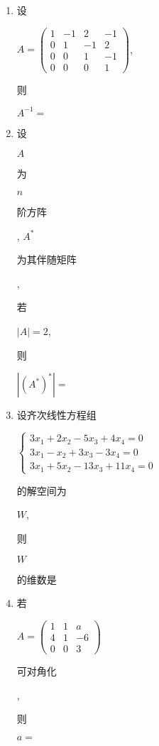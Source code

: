\documentclass[10pt]{article}
\begin{document}
\begin{enumerate}
  \item \begin{CJK}{UTF8}{mj}设\end{CJK} $A=\left(\begin{array}{cccc}1 & -1 & 2 & -1 \\ 0 & 1 & -1 & 2 \\ 0 & 0 & 1 & -1 \\ 0 & 0 & 0 & 1\end{array}\right)$, \begin{CJK}{UTF8}{mj}则\end{CJK} $A^{-1}=$

  \item \begin{CJK}{UTF8}{mj}设\end{CJK} $A$ \begin{CJK}{UTF8}{mj}为\end{CJK} $n$ \begin{CJK}{UTF8}{mj}阶方阵\end{CJK}, $A^{*}$ \begin{CJK}{UTF8}{mj}为其伴随矩阵\end{CJK}, \begin{CJK}{UTF8}{mj}若\end{CJK} $|A|=2$, \begin{CJK}{UTF8}{mj}则\end{CJK} $\left|\left(A^{*}\right)^{*}\right|=$

  \item \begin{CJK}{UTF8}{mj}设齐次线性方程组\end{CJK} $\left\{\begin{array}{c}3 x_{1}+2 x_{2}-5 x_{3}+4 x_{4}=0 \\ 3 x_{1}-x_{2}+3 x_{3}-3 x_{4}=0 \\ 3 x_{1}+5 x_{2}-13 x_{3}+11 x_{4}=0\end{array}\right.$ \begin{CJK}{UTF8}{mj}的解空间为\end{CJK} $W$, \begin{CJK}{UTF8}{mj}则\end{CJK} $W$ \begin{CJK}{UTF8}{mj}的维数是\end{CJK}

  \item \begin{CJK}{UTF8}{mj}若\end{CJK} $A=\left(\begin{array}{ccc}1 & 1 & a \\ 4 & 1 & -6 \\ 0 & 0 & 3\end{array}\right)$ \begin{CJK}{UTF8}{mj}可对角化\end{CJK}, \begin{CJK}{UTF8}{mj}则\end{CJK} $a=$


\end{enumerate}
\end{document}
